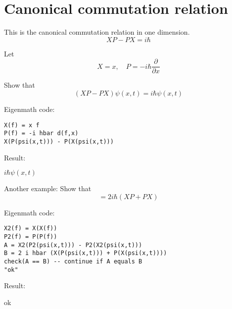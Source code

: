 

\section*{Canonical commutation relation}

This is the canonical commutation relation in one dimension.
\begin{equation*}
XP-PX=i\hbar
\end{equation*}

Let
\begin{equation*}
X=x,\quad P=-i\hbar\frac{\partial}{\partial x}
\end{equation*}

Show that
\begin{equation*}
(XP-PX)\psi(x,t)=i\hbar\psi(x,t)
\end{equation*}

\iffalse
Then
\begin{align*}
(XP-PX)\psi(x,t)&=XP\psi(x,t)-PX\psi(x,t)
\\
&=x\left(-i\hbar\frac{\partial}{\partial x}\psi(x,t)\right)
+i\hbar\frac{\partial}{\partial x}\bigl(x\psi(x,t)\bigr)
\\
&=-i\hbar x\frac{\partial}{\partial x}\psi(x,t)
+i\hbar\left(\frac{\partial}{\partial x}x\right)\psi(x,t)
+i\hbar x\frac{\partial}{\partial x}\psi(x,t)
\\
&=i\hbar\psi(x,t)
\end{align*}
\fi

Eigenmath code:
{\color{blue}
\begin{verbatim}
X(f) = x f
P(f) = -i hbar d(f,x)
X(P(psi(x,t))) - P(X(psi(x,t)))
\end{verbatim}}

Result:

\bigskip
$i\hbar\psi(x,t)$

\bigskip
Another example: Show that
\begin{equation*}
[X^2,P^2]=2i\hbar(XP+PX)
\end{equation*}

Eigenmath code:
{\color{blue}
\begin{verbatim}
X2(f) = X(X(f))
P2(f) = P(P(f))
A = X2(P2(psi(x,t))) - P2(X2(psi(x,t)))
B = 2 i hbar (X(P(psi(x,t))) + P(X(psi(x,t))))
check(A == B) -- continue if A equals B
"ok"
\end{verbatim}}

Result:

\bigskip
ok

\iffalse
\bigskip
Notes:
\begin{enumerate}
\item
Fedak  and Prentis write, ``The theory of Fourier and the correspondence principle of Bohr played a vital role in Heisenberg's development of quantum mechanics.''
\item
Aitchison, MacManus, and Snyder write, ``This `difficulty' clearly unsettled Heisenberg: but it very quickly became clear that the non-commutativity (in general) of kinematical quantities in quantum theory was the really essential new technical idea in the paper.''
\end{enumerate}
\fi


